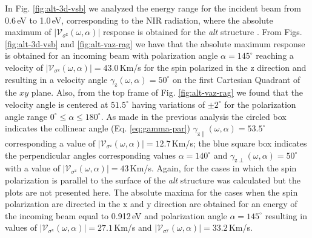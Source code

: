 \documentclass[prb,11pt,tightenlines,twocolumn,aps]{revtex4-1}
\begin{document}
In Fig. \ref{fig:alt-3d-vsb} we analyzed the energy range for the incident beam
from 0.6\,eV to 1.0\,eV, corresponding to the NIR radiation, where the absolute
maximum of $|\mathcal{V}_{\sigma^{\mathrm{z}}}(\omega,\alpha)|$ response is
obtained for the \emph{alt} structure .
% 
{\color{red} From Figs. \ref{fig:alt-3d-vsb} and \ref{fig:alt-vaz-rag} we have
that the absolute maximum response is obtained for an incoming beam with
polarization angle $\alpha=145^{\circ}$ reaching a velocity of
$|\mathcal{V}_{\sigma^{\mathrm{z}}}(\omega,\alpha)| = 43.0$\,Km/s for the spin
polarized in the $\mathrm{z}$ direction and resulting in a velocity angle
$\gamma_{\mathrm{z}}(\omega,\alpha)=50^{\circ}$ on the first Cartesian Quadrant
of the $xy$ plane.
% 
Also, from the top frame of Fig. \ref{fig:alt-vaz-rag} we found that the
velocity angle is centered at $51.5^{\circ}$ having variations of $\pm
2^{\circ}$ for the polarization angle range $0^{\circ} \leq
\alpha \leq 180^{\circ}$.
% 
As made in the previous analysis the circled box indicates the collinear angle
(Eq. \eqref{eq:gamma-par}) $\gamma_{\mathrm{z}\parallel}(\omega,\alpha) =
53.5^{\circ}$ corresponding a value of
$|\mathcal{V}_{\sigma^{\mathrm{z}}}(\omega,\alpha)| = 12.7$\,Km/s; the blue
square box indicates the perpendicular angles corresponding values
$\alpha=140^{\circ}$ and $\gamma_{\mathrm{z}\perp}(\omega,\alpha)=50^{\circ}$
with a value of $|\mathcal{V}_{\sigma^{\mathrm{z}}}(\omega,\alpha)|=43$\,Km/s.}
% 
Again, for the cases in which the spin polarization is parallel to the surface
of the \emph{alt} structure was calculated but the plots are not presented
here. The absolute maxima for the cases when the spin polarization are directed
in the $\mathrm{x}$ and $\mathrm{y}$ direction are obtained for an energy of
the incoming beam equal to 0.912\,eV and polarization angle
$\alpha=145^{\circ}$ resulting in values of
$|\mathcal{V}_{\sigma^{\mathrm{x}}}(\omega,\alpha)|=27.1$\,Km/s and
$|\mathcal{V}_{\sigma^{\mathrm{y}}}(\omega,\alpha)|=33.2$\,Km/s.

\end{document}

